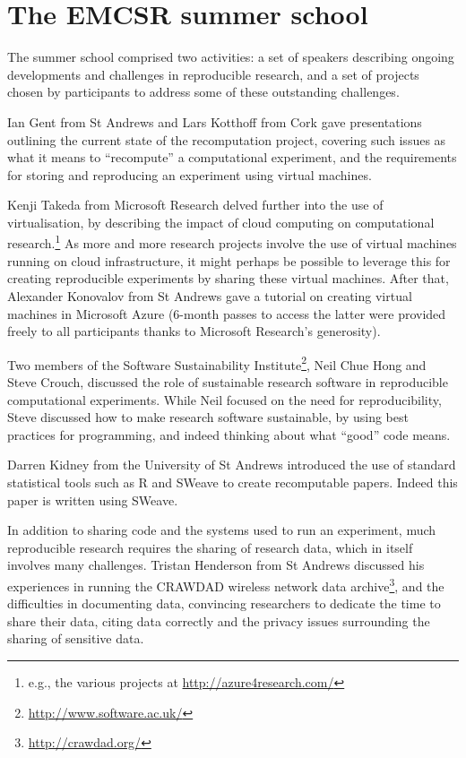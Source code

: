 \section{The EMCSR summer school}
\label{s:school}

The summer school comprised two activities: a set of speakers
describing ongoing developments and challenges in reproducible
research, and a set of projects chosen by participants to address some
of these outstanding challenges.

Ian Gent from St Andrews and Lars Kotthoff from Cork gave
presentations outlining the current state of the recomputation
project, covering such issues as what it means to ``recompute'' a
computational experiment, and the requirements for storing and
reproducing an experiment using virtual machines.

Kenji Takeda from Microsoft Research delved further into the use of
virtualisation, by describing the impact of cloud computing on
computational research.\footnote{e.g., the various projects at
\url{http://azure4research.com/}} As more and more research projects
involve the use of virtual machines running on cloud infrastructure,
it might perhaps be possible to leverage this for creating
reproducible experiments by sharing these virtual machines. After that,
Alexander Konovalov from St Andrews gave a tutorial on creating
virtual machines in Microsoft Azure (6-month passes to access the
latter were provided freely to all participants thanks to Microsoft Research's
generosity).

Two members of the Software Sustainability
Institute\footnote{\url{http://www.software.ac.uk/}}, Neil Chue Hong
and Steve Crouch, discussed the role of sustainable research software
in reproducible computational experiments. While Neil focused on the
need for reproducibility, Steve discussed how to make research
software sustainable, by using best practices for programming, and
indeed thinking about what ``good'' code means.

Darren Kidney from the University of St Andrews introduced the use of
standard statistical tools such as R and SWeave to create recomputable
papers. Indeed this paper is written using SWeave.

In addition to sharing code and the systems used to run an experiment,
much reproducible research requires the sharing of research data,
which in itself involves many challenges. Tristan Henderson from St
Andrews discussed his experiences in running the CRAWDAD wireless
network data archive\footnote{\url{http://crawdad.org/}}, and the
difficulties in documenting data, convincing researchers to dedicate
the time to share their data, citing data correctly and the privacy
issues surrounding the sharing of sensitive data.

